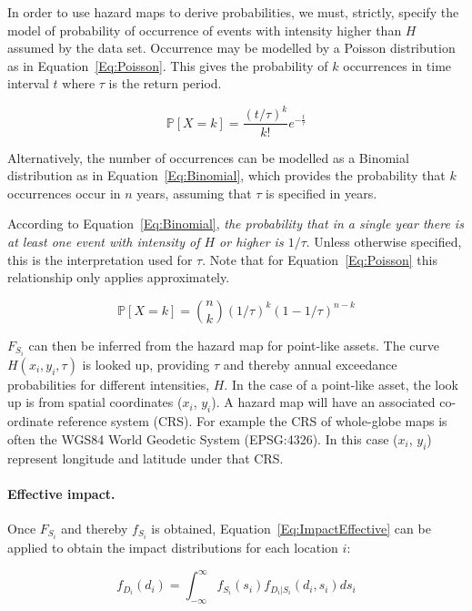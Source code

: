 \documentclass[a4paper,11pt]{extarticle} %
\begin{document}
In order to use hazard maps to derive probabilities, we must, strictly, specify the model of probability of occurrence of events with intensity higher than $H$ assumed by the data set. Occurrence may be modelled by a Poisson distribution as in Equation~\ref{Eq:Poisson}. This gives the probability of $k$ occurrences in time interval $t$ where $\tau$ is the return period.

 \begin{equation}
    \label{Eq:Poisson}
    \mathbb{P}[X = k] = \frac{(t / \tau)^k}{k!}  e^{-\frac{t}{\tau}}
\end{equation}

Alternatively, the number of occurrences can be modelled as a Binomial distribution as in Equation~\ref{Eq:Binomial}, which provides the probability that $k$ occurrences occur in $n$ years, assuming that $\tau$ is specified in years.

According to Equation~\ref{Eq:Binomial}, \emph{the probability that in a single year there is at least one event with intensity of $H$ or higher is $1/\tau$}. Unless otherwise specified, this is the interpretation used for $\tau$. Note that for Equation~\ref{Eq:Poisson} this relationship only applies approximately.

 \begin{equation}
    \label{Eq:Binomial}
    \mathbb{P}[X = k] = \binom{n}{k} (1/\tau)^k (1-1/\tau)^{n - k}
\end{equation}

$F_{S_i}$ can then be inferred from the hazard map for point-like assets. The curve $H(x_i, y_i, \tau)$ is looked up, providing $\tau$ and thereby annual exceedance probabilities for different intensities, $H$. In the case of a point-like asset, the look up is from spatial coordinates ($x_i$, $y_i$). A hazard map will have an associated co-ordinate reference system (CRS). For example the CRS of whole-globe maps is often the WGS84 World Geodetic System (EPSG:4326). In this case ($x_i$, $y_i$) represent longitude and latitude under that CRS.

\paragraph{Effective impact.} Once $F_{S_i}$ and thereby $f_{S_i}$ is obtained, Equation~\ref{Eq:ImpactEffective} can be applied to obtain the impact distributions for each location $i$:

 \begin{equation}
    \label{Eq:ImpactMarginal2}
    f_{D_i}(d_i) = \int_{-\infty}^{\infty} f_{S_i}(s_i) f_{D_i|S_i}(d_i, s_i) ds_i
\end{equation}
\end{document}
